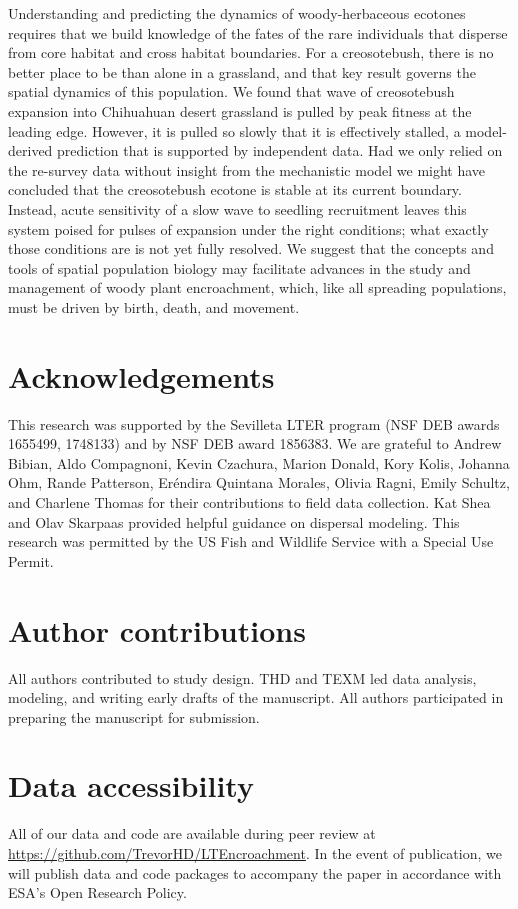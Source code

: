 \documentclass[11pt]{article}\usepackage[]{graphicx}\usepackage[]{color}
\begin{document}
Understanding and predicting the dynamics of woody-herbaceous ecotones requires that we build knowledge of the fates of the rare individuals that disperse from core habitat and cross habitat boundaries. 
For a creosotebush, there is no better place to be than alone in a grassland, and that key result governs the spatial dynamics of this population. 
We found that wave of creosotebush expansion into Chihuahuan desert grassland is pulled by peak fitness at the leading edge.
However, it is pulled so slowly that it is effectively stalled, a model-derived prediction that is supported by independent data. 
Had we only relied on the re-survey data without insight from the mechanistic model we might have concluded that the creosotebush ecotone is stable at its current boundary.
Instead, acute sensitivity of a slow wave to seedling recruitment leaves this system poised for pulses of expansion under the right conditions; what exactly those conditions are is not yet fully resolved.
We suggest that the concepts and tools of spatial population biology may facilitate advances in the study and management of woody plant encroachment, which, like all spreading populations, must be driven by birth, death, and movement. 


\section*{Acknowledgements}
This research was supported by the Sevilleta LTER program (NSF DEB awards 1655499, 1748133) and by NSF DEB award 1856383.
We are grateful to Andrew Bibian, Aldo Compagnoni, Kevin Czachura, Marion Donald, Kory Kolis, Johanna Ohm, Rande Patterson, Er\'{e}ndira Quintana Morales, Olivia Ragni, Emily Schultz, and Charlene Thomas for their contributions to field data collection.
Kat Shea and Olav Skarpaas provided helpful guidance on dispersal modeling.
This research was permitted by the US Fish and Wildlife Service with a Special Use Permit.

\section*{Author contributions}
All authors contributed to study design. 
THD and TEXM led data analysis, modeling, and writing early drafts of the manuscript. 
All authors participated in preparing the manuscript for submission.

\section*{Data accessibility}
All of our data and code are available during peer review at \url{https://github.com/TrevorHD/LTEncroachment}. 
In the event of publication, we will publish data and code packages to accompany the paper in accordance with ESA's Open Research Policy.
\end{document}
